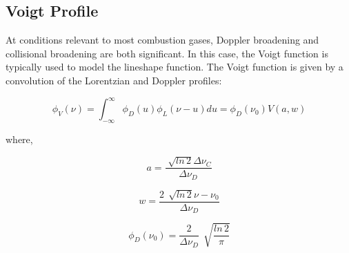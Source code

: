 

\subsection{Voigt Profile}
At conditions relevant to most combustion gases, Doppler broadening and collisional broadening are both significant. In this case, the Voigt function is typically used to model the lineshape function. The Voigt function is given by a convolution of the Lorentzian and Doppler profiles:

\begin{equation}\label{eq:ch2_10}
\phi_V(\nu)=\int_{-\infty}^{\infty}\phi_D(u)\phi_L(\nu-u)du=\phi_D(\nu_{0})V(a,w)
\end{equation}

\noindent where,

\begin{equation}\label{}
a=\frac{\sqrt[]{ln\,2}\Delta\nu_C}{\Delta\nu_D}
\end{equation}

\begin{equation}\label{}
w=\frac{2\,\sqrt[]{ln\,2}\nu-\nu_{0}}{\Delta\nu_D}
\end{equation}

\begin{equation}\label{eq:ch2_13}
\phi_D(\nu_{0})=\frac{2}{\Delta\nu_D}\,\sqrt[]{\frac{ln\,2}{\pi}}
\end{equation}

